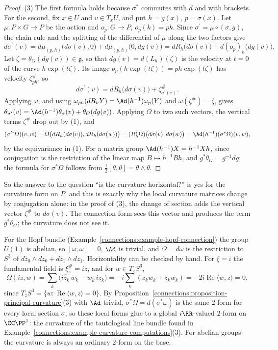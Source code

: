 \begin{proof}
(3) The first formula holds because $\sigma^*$ commutes with $d$ and with brackets. For the second, fix $x \in U$ and $v \in T_xU$, and put $h = g(x)$, $p = \sigma(x)$. Let $\mu \colon P \times G \to P$ be the action
and $o_p \colon G \to P$, $o_p(k) = pk$. Since $\sigma^{\prime} = \mu \circ (\sigma, g)$, the chain rule and the splitting of the differential of $\mu$ along the two factors give
\[
d\sigma^{\prime}(v) = d\mu_{(p, h)}\bigl(d\sigma(v), 0\bigr) + d\mu_{(p, h)}\bigl(0, dg(v)\bigr) = dR_h\bigl(d\sigma(v)\bigr) + d(o_p)_h\bigl(dg(v)\bigr).
\]
Let $\zeta = \theta_G(dg(v)) \in \mathfrak{g}$, so that $dg(v) = d(L_h)(\zeta)$ is the velocity at $t = 0$ of the curve $h\exp(t\zeta)$. Its image $o_p(h\exp(t\zeta)) = ph\exp(t\zeta)$ has velocity
$\zeta^\#_{ph}$, so
\[
d\sigma^{\prime}(v) = dR_h\bigl(d\sigma(v)\bigr) + \zeta^\#_{\sigma^{\prime}(x)} .
\]
Applying $\omega$, and using $\omega_{ph}(dR_hY) = \Ad(h^{-1})\omega_p(Y)$ and $\omega(\zeta^\#) = \zeta$, gives $\theta_{\sigma^{\prime}}(v) = \Ad(h^{-1})\theta_\sigma(v) + \theta_G(dg(v))$. Applying $\Omega$ to two such
vectors, the vertical terms $\zeta^\#$ drop out by (1), and
\[
(\sigma^{\prime*}\Omega)(v, w) = \Omega\bigl(dR_h(d\sigma(v)), dR_h(d\sigma(w))\bigr) = (R_h^*\Omega)\bigl(d\sigma(v), d\sigma(w)\bigr) = \Ad(h^{-1})(\sigma^*\Omega)(v, w),
\]
by the equivariance in (1). For a matrix group $\Ad(h^{-1})X = h^{-1}Xh$, since conjugation is the restriction of the linear map $B \mapsto h^{-1}Bh$, and $g^*\theta_G = g^{-1}dg$; the formula for
$\sigma^*\Omega$ follows from $\frac12[\theta, \theta] = \theta \wedge \theta$.
\end{proof}

So the answer to the question ``is the curvature horizontal?'' is yes for the curvature form on $P$, and this is exactly why the local curvature matrices change by conjugation alone: in the proof of (3), the
change of section adds the vertical vector $\zeta^\#$ to $d\sigma(v)$. The connection form sees this vector and produces the term $g^*\theta_G$; the curvature does not see it.

\begin{example}\label{connections:example-hopf-curvature}
For the Hopf bundle (Example~\ref{connections:example-hopf-connection}) the group $U(1)$ is abelian, so $[\omega, \omega] = 0$, $\Ad$ is trivial, and $\Omega = d\omega$ is the restriction to $S^3$ of
$d\bar z_0 \wedge dz_0 + d\bar z_1 \wedge dz_1$. Horizontality can be checked by hand. For $\xi = i$ the fundamental field is $\xi^\#_z = iz$, and for $w \in T_zS^3$,
\[
\Omega(iz, w) = \sum_k\bigl(\overline{iz_k}\,w_k - \bar w_k\,iz_k\bigr) = -i\sum_k(\bar z_kw_k + z_k\bar w_k) = -2i\operatorname{Re}\langle w, z\rangle = 0,
\]
since $T_zS^3 = \{w : \operatorname{Re}\langle w, z\rangle = 0\}$. By Proposition~\ref{connections:proposition-principal-curvature}(3) with $\Ad$ trivial, $\sigma^*\Omega = d(\sigma^*\omega)$ is the same $2$-form for every
local section $\sigma$, so these local forms glue to a global $i\RR$-valued $2$-form on $\CC\PP^1$: the curvature of the tautological line bundle found in
Example~\ref{connections:example-curvature-computations}(3). For abelian groups the curvature is always an ordinary $2$-form on the base.
\end{example}

